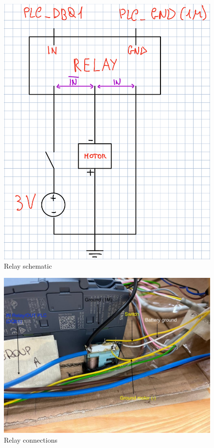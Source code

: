 \documentclass[a4paper,11pt]{report}
\theoremstyle{definition}
\theoremstyle{plain}
\begin{document}
                \begin{figure}[H]
                    \centering
                    \includegraphics[scale=0.35]{images/schemarele.png}
                    \caption{Relay schematic}
                    \label{schemarele}
                \end{figure} 
                \begin{figure}[H]
                    \centering
                    \includegraphics[scale=0.35]{images/releconn.jpeg}
                    \caption{Relay connections}
                \end{figure}
\end{document}
